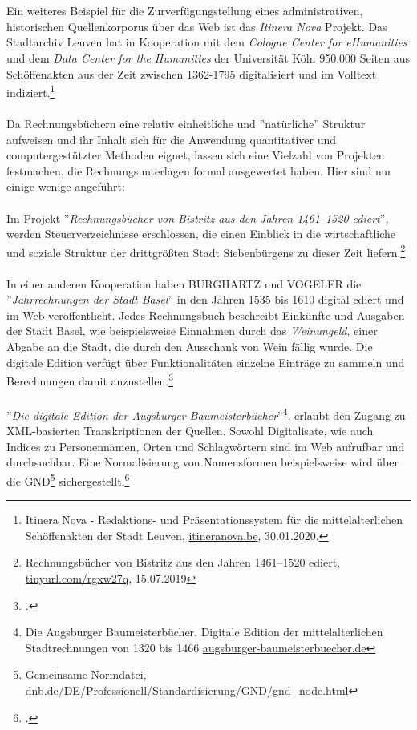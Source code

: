 \documentclass[12pt,a4paper]{article}
\begin{document}
\\
\\
Ein weiteres Beispiel für die Zurverfügungstellung eines administrativen, historischen Quellenkorporus über das Web ist das \textit{Itinera Nova} Projekt. Das Stadtarchiv Leuven hat in Kooperation mit dem \textit{Cologne Center for eHumanities} und dem \textit{Data Center for the Humanities} der Universität Köln 950.000 Seiten aus Schöffenakten aus der Zeit zwischen 1362-1795 digitalisiert und im Volltext indiziert.\footnote{Itinera Nova - Redaktions- und Präsentationssystem für die mittelalterlichen Schöffenakten der Stadt Leuven, \url{itineranova.be}, 30.01.2020.}
\\
\\
Da Rechnungsbüchern eine relativ einheitliche und ''natürliche'' Struktur aufweisen und ihr Inhalt sich für die Anwendung quantitativer und computergestützter Methoden eignet, lassen sich eine Vielzahl von Projekten festmachen, die Rechnungsunterlagen formal ausgewertet haben. Hier sind nur einige wenige angeführt:
\\
\\
Im Projekt ''\textit{Rechnungsbücher von Bistritz aus den Jahren 1461–1520 ediert}'', werden Steuerverzeichnisse erschlossen, die einen Einblick in die wirtschaftliche und soziale Struktur der drittgrößten Stadt Siebenbürgens zu dieser Zeit liefern.\footnote{Rechnungsbücher von Bistritz aus den Jahren 1461–1520 ediert, \url{tinyurl.com/rgxw27q}, 15.07.2019}
\\
\\
In einer anderen Kooperation haben BURGHARTZ und VOGELER die ''\textit{Jahrrechnungen der Stadt Basel}'' in den Jahren 1535 bis 1610 digital ediert und im Web veröffentlicht. Jedes Rechnungsbuch beschreibt Einkünfte und Ausgaben der Stadt Basel, wie beispielsweise Einnahmen durch das \textit{Weinungeld}, einer Abgabe an die Stadt, die durch den Ausschank von Wein fällig wurde. Die digitale Edition verfügt über Funktionalitäten einzelne Einträge zu sammeln und  Berechnungen damit anzustellen.\footcite[][S.11-13, \protect\url{gams.uni-graz.at/srbas}]{vogeler2016content}
\\
\\
''\textit{Die digitale Edition der Augsburger Baumeisterbücher}''\footnote{Die Augsburger Baumeisterbücher. Digitale Edition der mittelalterlichen Stadtrechnungen von 1320 bis 1466 \protect\url{augsburger-baumeisterbuecher.de}}, erlaubt den Zugang zu XML-basierten Transkriptionen der Quellen. Sowohl Digitalisate, wie auch Indices zu Personennamen, Orten und Schlagwörtern sind im Web aufrufbar und durchsuchbar. Eine Normalisierung von Namensformen beispielsweise wird über die GND\footnote{Gemeinsame Normdatei, \protect\url{dnb.de/DE/Professionell/Standardisierung/GND/gnd_node.html}} sichergestellt.\footcite[][S.109-113]{wurz2016dh}
\end{document}
